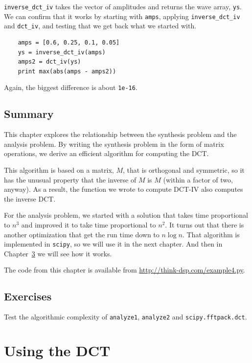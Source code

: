 \documentclass[12pt]{book}
\begin{document}
\verb"inverse_dct_iv" takes the vector of amplitudes and returns
the wave array, {\tt ys}.  We can confirm that it works by starting
with {\tt amps}, applying \verb"inverse_dct_iv" and \verb"dct_iv",
and testing that we get back what we started with.

\begin{verbatim}
    amps = [0.6, 0.25, 0.1, 0.05]
    ys = inverse_dct_iv(amps)
    amps2 = dct_iv(ys)
    print max(abs(amps - amps2))
\end{verbatim}

Again, the biggest difference is about {\tt 1e-16}.


\section{Summary}

This chapter explores the relationship between the synthesis problem
and the analysis problem.  By writing the synthesis problem in the
form of matrix operations, we derive an efficient algorithm for computing
the DCT.

This algorithm is based on a matrix, $M$, that is orthogonal and
symmetric, so it has the unusual property that the inverse of $M$ is
$M$ (within a factor of two, anyway).  As a result, the function we
wrote to compute DCT-IV also computes the inverse DCT.

For the analysis problem, we started with a solution that
takes time proportional to $n^3$ and improved it to take time
proportional to $n^2$.  It turns out that there is another optimization
that get the run time down to $n \log n$.  That algorithm is implemented
in {\tt scipy}, so we will use it in the next chapter.  And then in
Chapter~\ref{} we will see how it works.

The code from this chapter is available from
\url{http://think-dsp.com/example4.py}.





\section{Exercises}

\begin{exercise}
Test the algorithmic complexity of {\tt analyze1}, {\tt analyze2}
and {\tt scipy.fftpack.dct}.
\end{exercise}


\chapter{Using the DCT}
\end{document}
